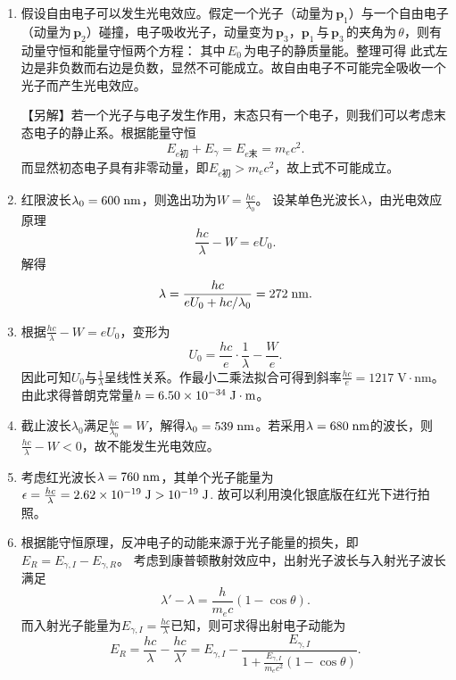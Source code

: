 \begin{enumerate}[label=1.\arabic*, leftmargin=-0.5mm]
\item%
假设自由电子可以发生光电效应。假定一个光子（动量为$\,\mathbf{p}_1$）与一个自由电子（动量为$\,\mathbf{p}_2$）碰撞，电子吸收光子，动量变为$\,\mathbf{p}_3$，$\mathbf{p}_1\,$与$\,\mathbf{p}_3\,$的夹角为$\,\theta$，则有动量守恒和能量守恒两个方程：
其中$\,E_0\,$为电子的静质量能。整理可得
此式左边是非负数而右边是负数，显然不可能成立。故自由电子不可能完全吸收一个光子而产生光电效应。

【另解】若一个光子与电子发生作用，末态只有一个电子，则我们可以考虑末态电子的静止系。根据能量守恒
\[E_{e\text{初}} + E_\gamma = E_{e\text{末}} = m_e c^2.\]
而显然初态电子具有非零动量，即$E_{e\text{初}}>m_e c^2$，故上式不可能成立。

\item
红限波长$\lambda_0 = 600\;\mathrm{nm}$，则逸出功为$W=\frac{hc}{\lambda_0}$。
设某单色光波长$\lambda$，由光电效应原理
\[\frac{hc}{\lambda}-W = eU_0.\]
解得
\[\lambda=\frac{hc}{eU_0+hc/\lambda_0} = 272\;\mathrm{nm}.\]

\item
根据$\frac{hc}{\lambda}-W = eU_0$，变形为
\[U_0 = \frac{hc}{e}\cdot \frac{1}{\lambda}-\frac{W}{e}.\]
因此可知$U_0$与$\frac{1}{\lambda}$呈线性关系。作最小二乘法拟合可得到斜率$\frac{hc}{e} = 1217\;\mathrm{V\cdot nm}$。由此求得普朗克常量$h=6.50\times 10^{-34}\;\mathrm{J\cdot m}$。

\item
截止波长$\lambda_0$满足$\frac{hc}{\lambda_0}=W$，解得$\lambda_0 = 539\;\mathrm{nm}$。若采用$\lambda=680\;\mathrm{nm}$的波长，则$\frac{hc}{\lambda}-W<0$，故不能发生光电效应。

\item
考虑红光波长$\lambda=760\;\mathrm{nm}$，其单个光子能量为$\epsilon = \frac{hc}{\lambda}=2.62\times 10^{-19}\;\mathrm{J}>10^{-19}\;\mathrm{J}$.
故可以利用溴化银底版在红光下进行拍照。

\item
根据能守恒原理，反冲电子的动能来源于光子能量的损失，即$E_R = E_{\gamma,I}-E_{\gamma,R}$。
考虑到康普顿散射效应中，出射光子波长与入射光子波长满足
\[\lambda'-\lambda = \frac{h}{m_e c}(1-\cos\theta).\]
而入射光子能量为$E_{\gamma,I}=\frac{hc}{\lambda}$已知，则可求得出射电子动能为
\[E_R = \frac{hc}{\lambda}-\frac{hc}{\lambda'} = E_{\gamma,I} - \frac{E_{\gamma,I}}{1+\frac{E_{\gamma,I}}{m_e c^2}(1-\cos\theta)}.\]


\end{enumerate}
